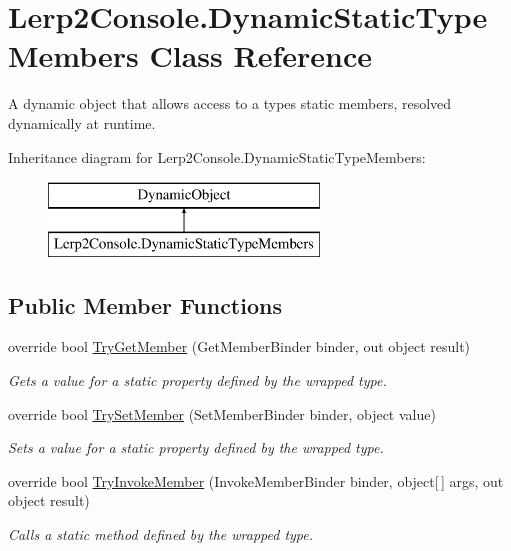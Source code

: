 \hypertarget{class_lerp2_console_1_1_dynamic_static_type_members}{}\section{Lerp2\+Console.\+Dynamic\+Static\+Type\+Members Class Reference}
\label{class_lerp2_console_1_1_dynamic_static_type_members}


A dynamic object that allows access to a type\textquotesingle{}s static members, resolved dynamically at runtime.  


Inheritance diagram for Lerp2\+Console.\+Dynamic\+Static\+Type\+Members\+:\begin{figure}[H]
\begin{center}
\leavevmode
\includegraphics[height=2.000000cm]{class_lerp2_console_1_1_dynamic_static_type_members}
\end{center}
\end{figure}
\subsection*{Public Member Functions}
\begin{DoxyCompactItemize}
\item 
override bool \hyperlink{class_lerp2_console_1_1_dynamic_static_type_members_a4bc97855ed3d800087cbc6e186bc67f6}{Try\+Get\+Member} (Get\+Member\+Binder binder, out object result)
\begin{DoxyCompactList}\small\item\em Gets a value for a static property defined by the wrapped type. \end{DoxyCompactList}\item 
override bool \hyperlink{class_lerp2_console_1_1_dynamic_static_type_members_a3e5cbd1d942def05f15209f85e0a706b}{Try\+Set\+Member} (Set\+Member\+Binder binder, object value)
\begin{DoxyCompactList}\small\item\em Sets a value for a static property defined by the wrapped type. \end{DoxyCompactList}\item 
override bool \hyperlink{class_lerp2_console_1_1_dynamic_static_type_members_a80c9ae20785234345637299aba800f2a}{Try\+Invoke\+Member} (Invoke\+Member\+Binder binder, object\mbox{[}$\,$\mbox{]} args, out object result)
\begin{DoxyCompactList}\small\item\em Calls a static method defined by the wrapped type. \end{DoxyCompactList}\end{DoxyCompactItemize}
